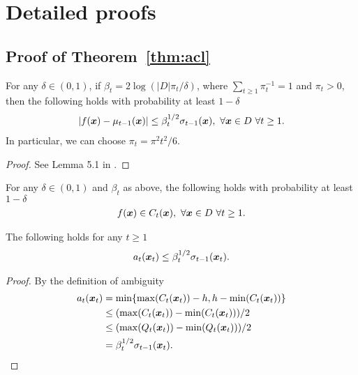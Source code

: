 ﻿\appendix
\chapter{Detailed proofs}

\section{Proof of Theorem~\ref*{thm:acl}} \label{app:acl}

\begin{lemma}
\label{lem:srin1}
For any $\delta \in (0, 1)$, if $\beta_t = 2\log(|D|\pi_t/\delta)$, where
$\sum_{t\geq1}\pi_t^{-1} = 1$ and $\pi_t > 0$, then the following holds with
probability at least $1-\delta$
\begin{align*}
|f(\bm{x}) - \mu_{t-1}(\bm{x})| \leq \beta_t^{1/2}\sigma_{t-1}(\bm{x}),\ \forall \bm{x} \in D\ \forall t \geq 1.
\end{align*}
In particular, we can choose $\pi_t = \pi^2 t^2/6$.
\end{lemma}
\begin{proof}
See Lemma 5.1 in \cite{srinivas10}.
\end{proof}

\begin{cor}
\label{cor:cs}
For any $\delta \in (0, 1)$ and $\beta_t$ as above, the following holds
with probability at least $1-\delta$
\begin{align*}
f(\bm{x}) \in C_t(\bm{x}),\ \forall \bm{x} \in D\ \forall t \geq 1.
\end{align*}
\end{cor}

\begin{lemma}
\label{lem:wb}
The following holds for any $t \geq 1$
\begin{align*}
a_t(\bm{x}_t) \leq \beta_t^{1/2}\sigma_{t-1}(\bm{x}_t).
\end{align*}
\end{lemma}
\begin{proof}
By the definition of ambiguity
\begin{align*}
a_t(\bm{x}_t) &= \min\{\max(C_t(\bm{x}_t)) - h, h - \min(C_t(\bm{x}_t))\}\\
           &\leq (\max(C_t(\bm{x}_t)) - \min(C_t(\bm{x}_t)))/2\\
           &\leq (\max(Q_t(\bm{x}_t)) - \min(Q_t(\bm{x}_t)))/2\\
           &= \beta_t^{1/2}\sigma_{t-1}(\bm{x}_t).
\end{align*}
\end{proof}

